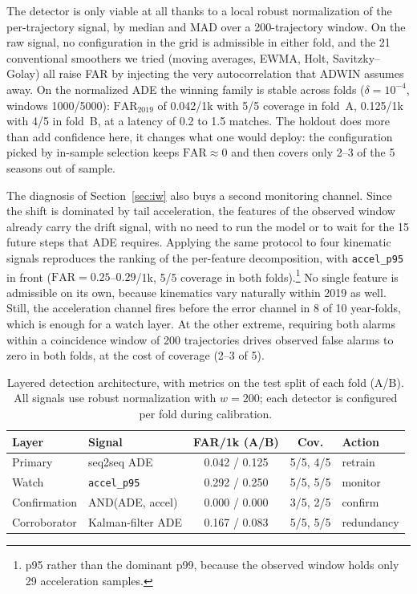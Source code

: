 \documentclass[runningheads]{llncs}
\begin{document}
The detector is only viable at all thanks to a local robust normalization of the
per-trajectory signal, by median and MAD over a 200-trajectory window. On the
raw signal, no configuration in the grid is admissible in either fold, and the
21 conventional smoothers we tried (moving averages, EWMA, Holt,
Savitzky--Golay) all raise FAR by injecting the very autocorrelation that ADWIN
assumes away. On the normalized ADE the winning family is stable across folds
($\delta = 10^{-4}$, windows 1000/5000): $\mathrm{FAR}_{2019}$ of 0.042/1k with
5/5 coverage in fold~A, 0.125/1k with 4/5 in fold~B, at a latency of 0.2 to 1.5
matches. The holdout does more than add confidence here, it changes what one
would deploy: the configuration picked by in-sample selection keeps
$\mathrm{FAR} \approx 0$ and then covers only 2--3 of the 5 seasons out of
sample.

The diagnosis of Section~\ref{sec:iw} also buys a second monitoring channel.
Since the shift is dominated by tail acceleration, the features of the observed
window already carry the drift signal, with no need to run the model or to wait
for the 15 future steps that ADE requires. Applying the same protocol to four
kinematic signals reproduces the ranking of the per-feature decomposition, with
\texttt{accel\_p95} in front ($\mathrm{FAR} = 0.25$--$0.29$/1k, 5/5 coverage in
both folds).\footnote{p95 rather than the dominant p99, because the observed
window holds only 29 acceleration samples.} No single feature is admissible on
its own, because kinematics vary naturally within 2019 as well. Still, the
acceleration channel fires before the error channel in 8 of 10 year-folds, which
is enough for a watch layer. At the other extreme, requiring both alarms within
a coincidence window of 200 trajectories drives observed false alarms to zero in
both folds, at the cost of coverage (2--3 of 5).

\begin{table}[t]
\centering
\caption{Layered detection architecture, with metrics on the test split of
each fold (A/B). All signals use robust normalization with $w = 200$; each
detector is configured per fold during calibration.}
\label{tab:detection}
\small
\setlength{\tabcolsep}{3pt}
\begin{tabular}{@{}llccl@{}}
\toprule
\textbf{Layer} & \textbf{Signal} & \textbf{FAR/1k (A/B)} & \textbf{Cov.}
 & \textbf{Action} \\
\midrule
Primary      & seq2seq ADE          & 0.042 / 0.125 & 5/5, 4/5 & retrain \\
Watch        & \texttt{accel\_p95}  & 0.292 / 0.250 & 5/5, 5/5 & monitor \\
Confirmation & AND(ADE, accel)      & 0.000 / 0.000 & 3/5, 2/5 & confirm \\
\midrule
Corroborator & Kalman-filter ADE  & 0.167 / 0.083 & 5/5, 5/5 & redundancy \\
\bottomrule
\end{tabular}
\end{table}
\end{document}
